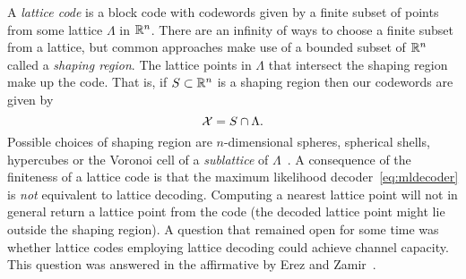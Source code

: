 \documentclass[draftcls, onecolumn, 11pt]{IEEEtran}
\begin{document}

A \emph{lattice code} is a block code with codewords given by a finite subset of points from some lattice $\Lambda$ in ${\mathbb R}^n$.  There are an infinity of ways to choose a finite subset from a lattice, but common approaches make use of a bounded subset of ${\mathbb R}^n$ called a \emph{shaping region}.  The lattice points in $\Lambda$ that intersect the shaping region make up the code.  That is, if $S \subset {\mathbb R}^n$ is a shaping region then our codewords are given by
\[
\mathcal X = S \cap \Lambda.
\]
Possible choices of shaping region are $n$-dimensional spheres, spherical shells, hypercubes or the Voronoi cell of a \emph{sublattice} of $\Lambda$~\cite{Buda1989_some_opt_codes_structure,Erex2004_lattice_decoding,Conway1983VoronoiCodes}. A consequence of the finiteness of a lattice code is that the maximum likelihood decoder~\eqref{eq:mldecoder} is \emph{not} equivalent to lattice decoding.  Computing a nearest lattice point will not in general return a lattice point from the code (the decoded lattice point might lie outside the shaping region).  A question that remained open for some time was whether lattice codes employing lattice decoding could achieve channel capacity.  This question was answered in the affirmative by Erez and Zamir~\cite{Erex2004_lattice_decoding}.
\end{document}
